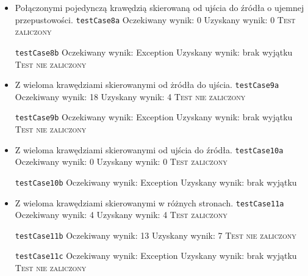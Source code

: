 \begin{itemize}[nosep]
    \item Połączonymi pojedynczą krawędzią skierowaną od ujścia do źródła o ujemnej przepustowości.
    \texttt{testCase8a}
    Oczekiwany wynik: 0
    Uzyskany wynik: 0
    \textsc{Test zaliczony}

    \texttt{testCase8b}
    Oczekiwany wynik: Exception
    Uzyskany wynik: brak wyjątku
    \textsc{Test nie zaliczony}

    \item Z wieloma krawędziami skierowanymi od żródła do ujścia.
    \texttt{testCase9a}
    Oczekiwany wynik: 18
    Uzyskany wynik: 4
    \textsc{Test nie zaliczony}

    \texttt{testCase9b}
    Oczekiwany wynik: Exception
    Uzyskany wynik: brak wyjątku
    \textsc{Test nie zaliczony}

    \item Z wieloma krawędziami skierowanymi od ujścia do źródła.
    \texttt{testCase10a}
    Oczekiwany wynik: 0
    Uzyskany wynik: 0
    \textsc{Test zaliczony}

    \texttt{testCase10b}
    Oczekiwany wynik: Exception
    Uzyskany wynik: brak wyjątku


    \item Z wieloma krawędziami skierowanymi w różnych stronach.
    \texttt{testCase11a}
    Oczekiwany wynik: 4
    Uzyskany wynik: 4
    \textsc{Test zaliczony}

    \texttt{testCase11b}
    Oczekiwany wynik: 13
    Uzyskany wynik: 7
    \textsc{Test nie zaliczony}

    \texttt{testCase11c}
    Oczekiwany wynik: Exception
    Uzyskany wynik: brak wyjątku
    \textsc{Test nie zaliczony}


\end{itemize}


